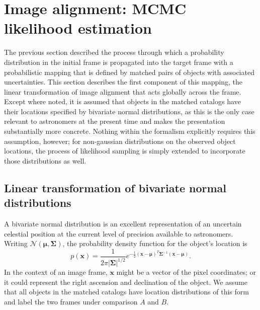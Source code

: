 \documentclass[manuscript]{aastex}
\newcommand{\bsmu}{\boldsymbol\mu}
\newcommand{\bsS}{\boldsymbol\Sigma}
\begin{document}

\section{Image alignment: MCMC likelihood estimation}\label{s:background}
The previous section described the process through which a probability distribution in the initial frame is propagated into the target frame with a probabilistic mapping that is defined by matched pairs of objects with associated uncertainties. This section describes the first component of this mapping, the linear transformation of image alignment that acts globally across the frame. Except where noted, it is assumed that objects in the matched catalogs have their locations specified by bivariate normal distributions, as this is the only case relevant to astronomers at the present time and makes the presentation substantially more concrete. Nothing within the formalism explicitly requires this assumption, however; for non-gaussian distributions on the observed object locations, the process of likelihood sampling is simply extended to incorporate those distributions as well.

\subsection{Linear transformation of bivariate normal distributions}
A bivariate normal distribution is an excellent representation of an uncertain celestial position at the current level of precision available to astronomers. Writing $\mathcal{N}(\bsmu, \bsS)$, the probability density function for the object's location is
\begin{equation}
p(\mathbf{x}) = \frac{1}{2\pi |\bsS|^{1/2}} e^{-\frac{1}{2}(\mathbf{x}-\bsmu)^T \bsS^{-1} (\mathbf{x}-\bsmu)}.
\end{equation}
In the context of an image frame, $\mathbf{x}$ might be a vector of the pixel coordinates; or it could represent the right ascension and declination of the object. We assume that all objects in the matched catalogs have location distributions of this form and label the two frames under comparison $A$ and $B$.
\end{document}
